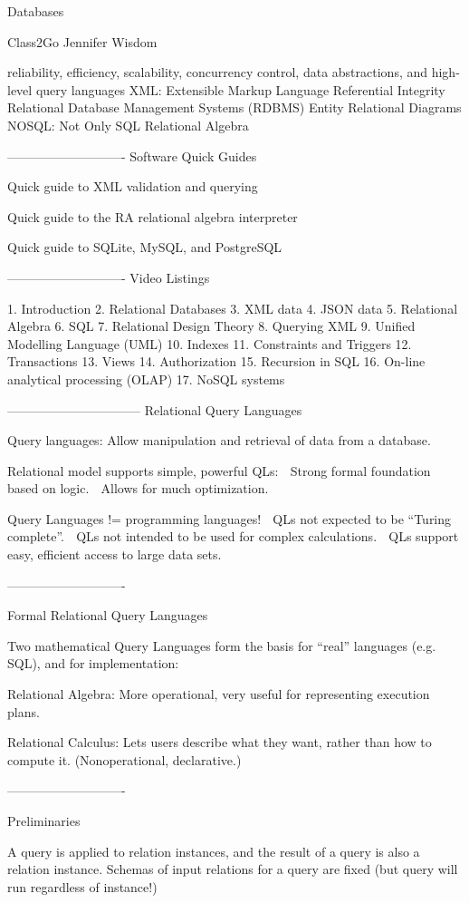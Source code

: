 Databases

Class2Go Jennifer Wisdom

reliability, efficiency, scalability, concurrency control, data abstractions, and high-level query languages
XML: Extensible Markup Language
Referential Integrity
Relational Database Management Systems (RDBMS)
Entity Relational Diagrams
NOSQL: Not Only SQL
Relational Algebra

----------------------------
Software Quick Guides

	Quick guide to XML validation and querying

	Quick guide to the RA relational algebra interpreter

	Quick guide to SQLite, MySQL, and PostgreSQL

----------------------------
Video Listings

1. Introduction
2. Relational Databases
3. XML data
4. JSON data
5. Relational Algebra
6. SQL
7. Relational Design Theory
8. Querying XML
9. Unified Modelling Language (UML)
10. Indexes
11. Constraints and Triggers
12. Transactions
13. Views
14. Authorization
15. Recursion in SQL
16. On-line analytical processing (OLAP)
17. NoSQL systems

--------------------------------
Relational Query Languages

Query languages:  Allow manipulation and retrieval 
of data from a database.

Relational model supports simple, powerful QLs:
 Strong formal foundation based on logic.
 Allows for much optimization.

Query Languages != programming languages!
 QLs not expected to be “Turing complete”.
 QLs not intended to be used for complex calculations.
 QLs support easy, efficient access to large data sets.

----------------------------

Formal Relational Query Languages

 Two mathematical Query Languages form 
the basis for “real” languages (e.g. SQL), and 
for implementation:

Relational Algebra:  More operational, very useful 
for representing execution plans.

Relational Calculus:   Lets users describe what they 
want, rather than how to compute it.  (Nonoperational,
 declarative.)

----------------------------

Preliminaries

A query is applied to relation instances, and the  result of a query is also a relation instance.
Schemas of input relations for a query are fixed (but query will run regardless of instance!)

